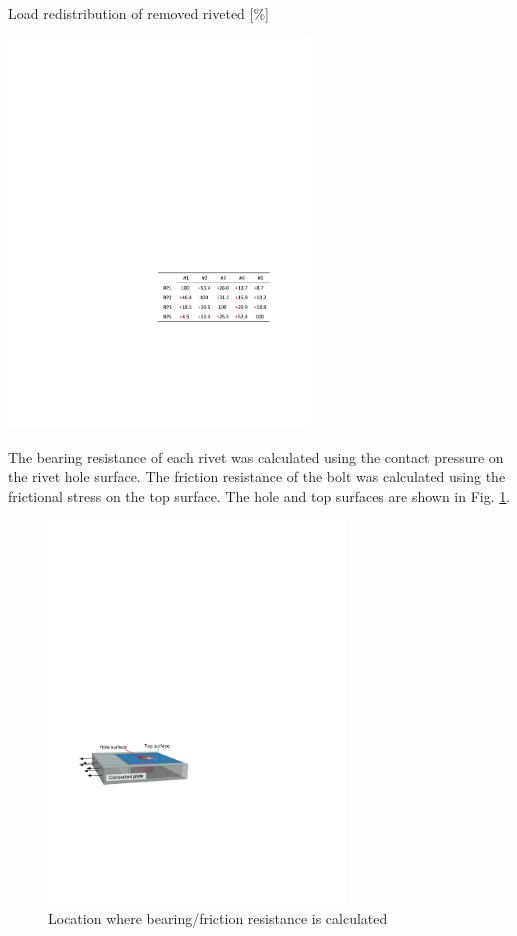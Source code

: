 \begin{table}[htbp]
    \centering
    \caption{Load redistribution of removed riveted [\%]}\label{tab-l5}
    \includegraphics[width=0.6\textwidth]{imgs/ch4/tab-l5.pdf}
\end{table}

The bearing resistance of each rivet was calculated using the contact pressure on the rivet hole surface. The friction resistance of the bolt was calculated using the frictional stress on the top surface. The hole and top surfaces are shown in Fig. \ref{fig-l9}.

\begin{figure}[htbp]
    \centering
    \includegraphics[width=0.7\textwidth]{imgs/ch4/fig-l9.pdf}
    \caption{Location where bearing/friction resistance is calculated}
    \label{fig-l9}
\end{figure}

